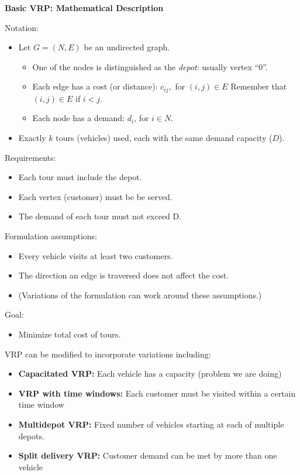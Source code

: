 \documentclass[11pt]{article}
\theoremstyle{definition}
\begin{document}
\begin{tcolorbox}
\textbf{Basic VRP:  Mathematical Description}

Notation: 
\begin{itemize}
	\item Let $G = (N,E)$ be an undirected graph.  
		\begin{itemize}
			\item One of the nodes is distinguished as the \emph{depot}: usually vertex ``$0$''.
			\item Each edge has a cost (or distance): $c_{ij},$ for $(i,j) \in E$ Remember that $(i,j) \in E$ if $i < j$.
			\item Each node has a demand: $d_i$, for $i \in N$.
		\end{itemize}
	\item  Exactly $k$ tours (vehicles) used, each with the same demand capacity ($D$).
\end{itemize}

Requirements:
\begin{itemize}
	\item Each tour must include the depot.
	\item Each vertex (customer) must be be served.
	\item The demand of each tour must not exceed D.
\end{itemize}

Formulation assumptions:
\begin{itemize}
	\item Every vehicle visits at least two customers.
	\item The direction an edge is traversed does not affect the cost.
	\item (Variations of the formulation can work around these assumptions.)
\end{itemize}
Goal:
\begin{itemize}
	\item  Minimize total cost of tours.
\end{itemize}
\end{tcolorbox}


VRP can be modified to incorporate variations including:
\begin{itemize}
\item \textbf{Capacitated VRP:} Each vehicle has a capacity (problem we are doing)
\item \textbf{VRP with time windows:}  Each customer must be visited within a certain time window
\item \textbf{Multidepot VRP:}  Fixed number of vehicles starting at each of multiple depots. 
\item \textbf{Split delivery VRP: } Customer demand can be met by more than one vehicle
\end{itemize}
\end{document}
